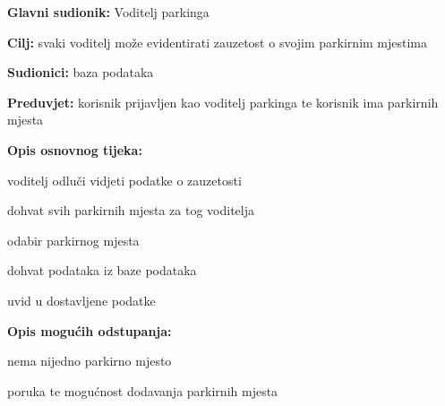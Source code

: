     				\begin{packed_item}
    					
    					\item \textbf{Glavni sudionik: } Voditelj parkinga
    					\item  \textbf{Cilj:} svaki voditelj može evidentirati zauzetost o svojim parkirnim mjestima
    					\item  \textbf{Sudionici:} baza podataka
    					\item  \textbf{Preduvjet:} korisnik prijavljen kao voditelj parkinga te korisnik ima parkirnih mjesta
    					\item  \textbf{Opis osnovnog tijeka:}
    					
    					\item[] \begin{packed_enum}
    						
    						\item voditelj odluči vidjeti podatke o zauzetosti
    						\item dohvat svih parkirnih mjesta za tog voditelja
    						\item odabir parkirnog mjesta
    						\item dohvat podataka iz baze podataka
    						\item uvid u dostavljene podatke 
    					\end{packed_enum}
    					
    					\item  \textbf{Opis mogućih odstupanja:}
    					
    					\item[] \begin{packed_item}
    						
    						\item[2.a] nema nijedno parkirno mjesto
    						\item[] \begin{packed_enum}
    							
    							\item poruka te mogućnost dodavanja parkirnih mjesta
    							
    						\end{packed_enum}
    						
    					\end{packed_item}
    				\end{packed_item}
    				\noindent {}
